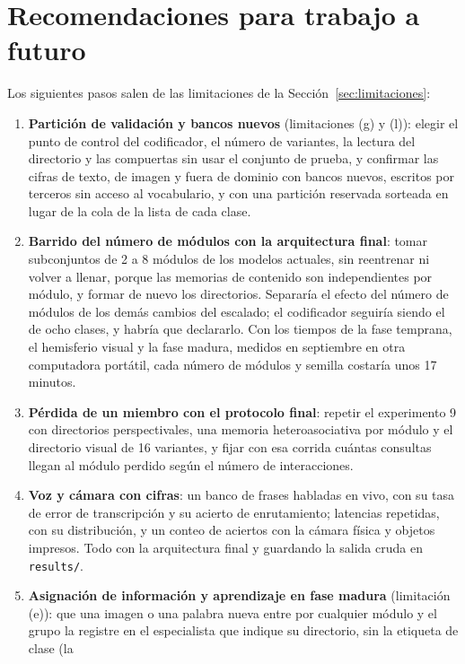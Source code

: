 \section{Recomendaciones para trabajo a futuro}
Los siguientes pasos salen de las limitaciones de la Sección~\ref{sec:limitaciones}:
\begin{enumerate}
    \item \textbf{Partición de validación y bancos nuevos} (limitaciones (g) y (l)): elegir el
    punto de control del codificador, el número de variantes, la lectura del directorio y
    las compuertas sin usar el conjunto de prueba, y confirmar las cifras de texto, de
    imagen y fuera de dominio con bancos nuevos, escritos por terceros sin acceso al
    vocabulario, y con una partición reservada sorteada en lugar de la cola de la lista
    de cada clase.
    \item \textbf{Barrido del número de módulos con la arquitectura final}: tomar
    subconjuntos de 2 a 8 módulos de los modelos actuales, sin reentrenar ni volver a
    llenar, porque las memorias de contenido son independientes por módulo, y formar de
    nuevo los directorios.
    Separaría el efecto del número de módulos de los demás cambios del escalado; el
    codificador seguiría siendo el de ocho clases, y habría que declararlo.
    Con los tiempos de la fase temprana, el hemisferio visual y la fase madura, medidos en
    septiembre en otra computadora portátil, cada número de módulos y semilla costaría
    unos 17 minutos.
    \item \textbf{Pérdida de un miembro con el protocolo final}: repetir el experimento 9
    con directorios perspectivales, una memoria heteroasociativa por módulo y el
    directorio visual de 16 variantes, y fijar con esa corrida cuántas consultas llegan al
    módulo perdido según el número de interacciones.
    \item \textbf{Voz y cámara con cifras}: un banco de frases habladas en vivo, con su
    tasa de error de transcripción y su acierto de enrutamiento; latencias repetidas, con
    su distribución, y un conteo de aciertos con la cámara física y objetos impresos.
    Todo con la arquitectura final y guardando la salida cruda en \texttt{results/}.
    \item \textbf{Asignación de información y aprendizaje en fase madura} (limitación
    (e)): que una imagen o una palabra nueva entre por cualquier módulo y el grupo la
    registre en el especialista que indique su directorio, sin la etiqueta de clase (la

\end{enumerate}
